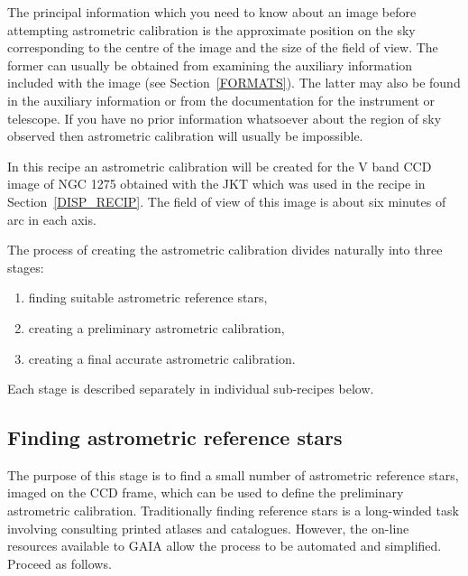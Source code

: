 \documentclass[twoside,11pt]{starlink}
\begin{document}
The principal information which you need to know about an image before
attempting astrometric calibration is the approximate position on the sky
corresponding to the centre of the image and the size of the field of view.
The former can usually be obtained from examining the auxiliary information
included with the image (see Section~\ref{FORMATS}).  The latter may also
be found in the auxiliary information or from the documentation for the
instrument or telescope.  If you have no prior information whatsoever
about the region of sky observed then astrometric calibration will usually
be impossible.

In this recipe an astrometric calibration will be created for the V band
CCD image of NGC 1275 obtained with the JKT which was used in the recipe
in Section~\ref{DISP_RECIP}.  The field of view of this image is about
six minutes of arc in each axis.

The process of creating the astrometric calibration divides naturally
into three stages:

\begin{enumerate}

  \item finding suitable astrometric reference stars,

  \item creating a preliminary astrometric calibration,

  \item creating a final accurate astrometric calibration.

\end{enumerate}

Each stage is described separately in individual sub-recipes below.

\subsection{Finding astrometric reference stars}

The purpose of this stage is to find a small number of astrometric
reference stars, imaged on the CCD frame, which can be used to define the
preliminary astrometric calibration.  Traditionally finding reference
stars is a long-winded task involving consulting printed atlases and
catalogues.  However, the on-line resources available to GAIA allow the
process to be automated and simplified.  Proceed as follows.
\end{document}
